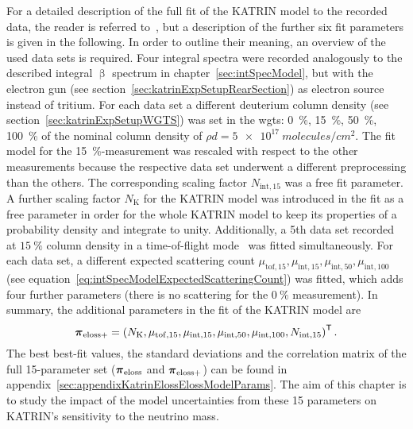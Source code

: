 For a detailed description of the full fit of the KATRIN model to the recorded data, the reader is referred to~\cite{Hannen2019_1}, but a description of the further six fit parameters is given in the following. In order to outline their meaning, an overview of the used data sets is required. Four integral spectra were recorded analogously to the described integral $\upbeta$ spectrum in chapter~\ref{sec:intSpecModel}, but with the electron gun (see section~\ref{sec:katrinExpSetupRearSection}) as electron source instead of tritium. For each data set a different deuterium column density (see section~\ref{sec:katrinExpSetupWGTS}) was set in the \gls{wgts}: \SI{0}{\percent}, \SI{15}{\percent}, \SI{50}{\percent}, \SI{100}{\percent} of the nominal column density of $\rho d = \SI{5e17}{molecules/cm^2}$. The fit model for the \mbox{\SI{15}{\percent}-measurement} was rescaled with respect to the other measurements because the respective data set underwent a different preprocessing than the others. The corresponding scaling factor $N_{\mathrm{int},15}$ was a free fit parameter. A further scaling factor $N_\mathrm{K}$ for the KATRIN model was introduced in the fit as a free parameter in order for the whole KATRIN model to keep its properties of a probability density and integrate to unity. Additionally, a 5th data set recorded at $\SI{15}{\percent}$ column density in a time-of-flight mode~\cite{Bonn1999} was fitted simultaneously. For each data set, a different expected scattering count $
\mu_{\mathrm{tof},15}, 
\mu_{\mathrm{int},15},  
\mu_{\mathrm{int},50},  
\mu_{\mathrm{int},100}$ (see equation~\ref{eq:intSpecModelExpectedScatteringCount}) was fitted, which adds four further parameters (there is no scattering for the $\SI{0}{\percent}$ measurement). In summary, the additional parameters in the fit of the KATRIN model are
\begin{equation}
\label{eq:katrinElossElossModelExtendedParams}
	\boldsymbol{\mathbf{\pi}}_\mathrm{eloss+} = 
	{\left(
		N_\mathrm{K},
		\mu_{\mathrm{tof},15},
		\mu_{\mathrm{int},15}, 
		\mu_{\mathrm{int},50}, 
		\mu_{\mathrm{int},100},
		N_{\mathrm{int},15}
		\right)}^{\mathsf{T}}
	\text{\,.}
\end{equation}
The best best-fit values, the standard deviations and the correlation matrix of the full 15-parameter set ($\boldsymbol{\mathbf{\pi}}_\mathrm{eloss}$ and $\boldsymbol{\mathbf{\pi}}_\mathrm{eloss+}$) can be found in appendix~\ref{sec:appendixKatrinElossElossModelParams}. The aim of this chapter is to study the impact of the model uncertainties from these 15 parameters on KATRIN's sensitivity to the neutrino mass.

